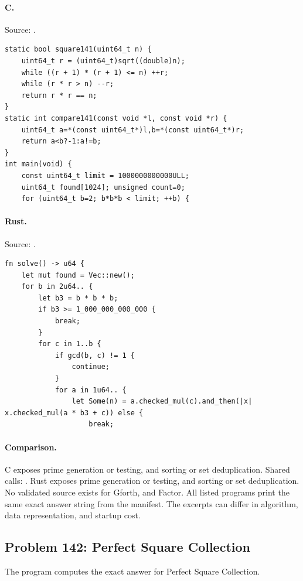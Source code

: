 \paragraph{C.} Source: .
\begin{lstlisting}
static bool square141(uint64_t n) {
    uint64_t r = (uint64_t)sqrt((double)n);
    while ((r + 1) * (r + 1) <= n) ++r;
    while (r * r > n) --r;
    return r * r == n;
}
static int compare141(const void *l, const void *r) {
    uint64_t a=*(const uint64_t*)l,b=*(const uint64_t*)r;
    return a<b?-1:a!=b;
}
int main(void) {
    const uint64_t limit = 1000000000000ULL;
    uint64_t found[1024]; unsigned count=0;
    for (uint64_t b=2; b*b*b < limit; ++b) {
\end{lstlisting}

\paragraph{Rust.} Source: .
\begin{lstlisting}
fn solve() -> u64 {
    let mut found = Vec::new();
    for b in 2u64.. {
        let b3 = b * b * b;
        if b3 >= 1_000_000_000_000 {
            break;
        }
        for c in 1..b {
            if gcd(b, c) != 1 {
                continue;
            }
            for a in 1u64.. {
                let Some(n) = a.checked_mul(c).and_then(|x| x.checked_mul(a * b3 + c)) else {
                    break;
\end{lstlisting}

\paragraph{Comparison.}
C exposes prime generation or testing, and sorting or set deduplication. Shared calls: \texttt{}. Rust exposes prime generation or testing, and sorting or set deduplication.
No validated source exists for Gforth, and Factor.
All listed programs print the same exact answer string from the manifest. The excerpts can differ in algorithm, data representation, and startup cost.

\subsection{Problem 142: Perfect Square Collection}
\label{walkthrough:p142}
The program computes the exact answer for Perfect Square Collection.

